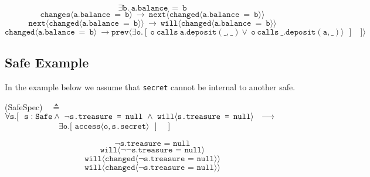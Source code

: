\documentclass[12pt]{article}
\begin{document}
$$\exists \texttt{b}.\ \texttt{a.balance}\ = \ \texttt{b}$$
$$\texttt{changes}\langle \texttt{a.balance}\ = \ \texttt{b} \rangle\ \longrightarrow\ \texttt{next}\langle \texttt{changed}\langle \texttt{a.balance}\ = \ \texttt{b} \rangle \rangle$$
$$\texttt{next}\langle \texttt{changed}\langle \texttt{a.balance}\ = \ \texttt{b} \rangle \rangle\ \longrightarrow\ \texttt{will}\langle \texttt{changed}\langle \texttt{a.balance}\ = \ \texttt{b} \rangle \rangle$$
$$\texttt{changed}\langle \texttt{a.balance}\ =\ \texttt{b} \rangle\ \longrightarrow \texttt{prev}\langle \exists \texttt{o}. [\    \texttt{o}\ \texttt{calls}\ {\texttt{a.}}{\texttt{deposit}}({\_,\_}) \vee\  \texttt{o}\ \texttt{calls}\ {\_.}{\texttt{deposit}}({\texttt{a},\_})\rangle\  \ ] \ \ \ \ ] \rangle$$

\subsection{Safe Example}
In the example below we assume that \texttt{secret} cannot be internal to another safe.
 
  \vspace{.01in}
(SafeSpec)\ \  $\triangleq$\\ 
$\forall \texttt{s}.[\ \ \texttt{s}:\texttt{Safe} \wedge\ \neg \texttt{s.treasure = null}\ \wedge\ \texttt{will}\langle \texttt{s.treasure = null} \rangle  \ \    
    \longrightarrow \ \    \hfill$ \\
  $\strut \hspace{2.3cm} 
  \exists \texttt{o}. [\    \texttt{access}\langle \texttt{o}, \texttt{s.secret} \rangle\  \ ] \ \ \ \ ] \hfill $
\vspace{.05in}

$$\neg \texttt{s.treasure = null}$$
$$\texttt{will}\langle\neg \neg \texttt{s.treasure = null}\rangle$$
$$\texttt{will}\langle \texttt{changed}\langle \neg \texttt{s.treasure = null} \rangle \rangle$$
$$\texttt{will}\langle \texttt{changed}\langle \neg \texttt{s.treasure = null} \rangle \rangle$$













\end{document}
